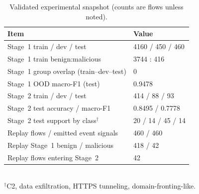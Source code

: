 \begin{table}[t]
  \centering
  \caption{Validated experimental snapshot (counts are flows unless noted).}
  \label{tab:validation}
  \footnotesize
  \setlength{\tabcolsep}{4pt}
  \begin{tabular}{@{}p{} p{}@{}}
    \toprule
    Item & Value \\
    \midrule
    Stage~1 train / dev / test & 4160 / 450 / 460 \\
    Stage~1 train benign:malicious & 3744 : 416 \\
    Stage~1 group overlap (train--dev--test) & 0 \\
    Stage~1 OOD macro-F1 (test) & 0.9478 \\
    \midrule
    Stage~2 train / dev / test & 414 / 88 / 93 \\
    Stage~2 test accuracy / macro-F1 & 0.8495 / 0.7778 \\
    Stage~2 test support by class$^{\dagger}$ & 20 / 14 / 45 / 14 \\
    \midrule
    Replay flows / emitted event signals & 460 / 460 \\
    Replay Stage~1 benign / malicious & 418 / 42 \\
    Replay flows entering Stage~2 & 42 \\
    \bottomrule
  \end{tabular}\\[-2pt]
  {\footnotesize $^{\dagger}$C2, data exfiltration, HTTPS tunneling, domain-fronting-like.}
\end{table}
